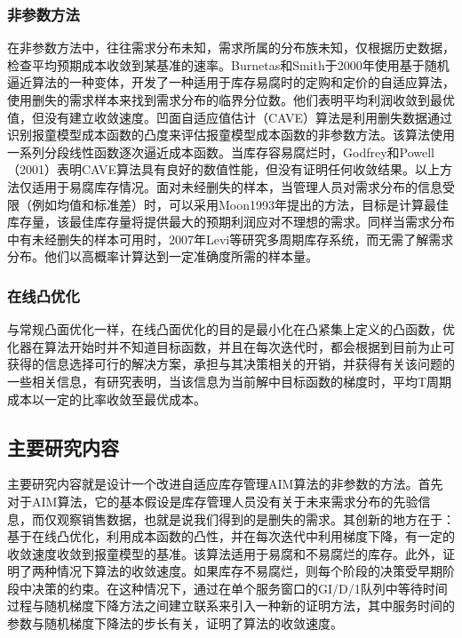 \documentclass[lang=cn,11pt,a4paper]{elegantpaper}
\begin{document}
\subsubsection{非参数方法}

在非参数方法中，往往需求分布未知，需求所属的分布族未知，仅根据历史数据，检查平均预期成本收敛到某基准的速率。Burnetas和Smith于2000年使用基于随机逼近算法的一种变体，开发了一种适用于库存易腐时的定购和定价的自适应算法，使用删失的需求样本来找到需求分布的临界分位数。他们表明平均利润收敛到最优值，但没有建立收敛速度。凹面自适应值估计（CAVE）算法是利用删失数据通过识别报童模型成本函数的凸度来评估报童模型成本函数的非参数方法。该算法使用一系列分段线性函数逐次逼近成本函数。当库存容易腐烂时，Godfrey和Powell（2001）表明CAVE算法具有良好的数值性能，但没有证明任何收敛结果。以上方法仅适用于易腐库存情况。面对未经删失的样本，当管理人员对需求分布的信息受限（例如均值和标准差）时，可以采用Moon1993年提出的方法，目标是计算最佳库存量，该最佳库存量将提供最大的预期利润应对不理想的需求。同样当需求分布中有未经删失的样本可用时，2007年Levi等研究多周期库存系统，而无需了解需求分布。他们以高概率计算达到一定准确度所需的样本量。

\subsubsection{在线凸优化}

与常规凸面优化一样，在线凸面优化的目的是最小化在凸紧集上定义的凸函数，优化器在算法开始时并不知道目标函数，并且在每次迭代时，都会根据到目前为止可获得的信息选择可行的解决方案，承担与其决策相关的开销，并获得有关该问题的一些相关信息，有研究表明，当该信息为当前解中目标函数的梯度时，平均T周期成本以一定的比率收敛至最优成本。

\subsection{主要研究内容}
主要研究内容就是设计一个改进自适应库存管理AIM算法的非参数的方法。首先对于AIM算法，它的基本假设是库存管理人员没有关于未来需求分布的先验信息，而仅观察销售数据，也就是说我们得到的是删失的需求。其创新的地方在于：基于在线凸优化，利用成本函数的凸性，并在每次迭代中利用梯度下降，有一定的收敛速度收敛到报童模型的基准。该算法适用于易腐和不易腐烂的库存。此外，证明了两种情况下算法的收敛速度。如果库存不易腐烂，则每个阶段的决策受早期阶段中决策的约束。在这种情况下，通过在单个服务窗口的GI/D/1队列中等待时间过程与随机梯度下降方法之间建立联系来引入一种新的证明方法，其中服务时间的参数与随机梯度下降法的步长有关，证明了算法的收敛速度。
\end{document}
